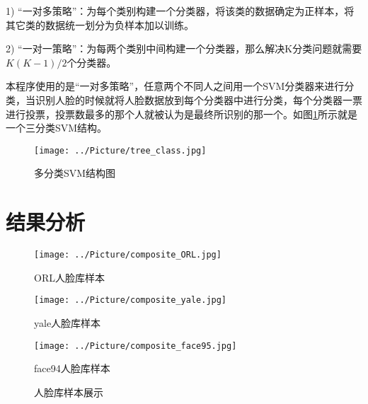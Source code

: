 \documentclass[a4paper,12pt]{ctexart}
\begin{document}
 1) “一对多策略”：为每个类别构建一个分类器，将该类的数据确定为正样本，将其它类的数据统一划分为负样本加以训练。
 
 2) “一对一策略”：为每两个类别中间构建一个分类器，那么解决K分类问题就需要$K(K-1)/2$个分类器。

 
 本程序使用的是“一对多策略”，任意两个不同人之间用一个SVM分类器来进行分类，当识别人脸的时候就将人脸数据放到每个分类器中进行分类，每个分类器一票进行投票，投票数最多的那个人就被认为是最终所识别的那一个。如图\ref{fig:msvm}所示就是一个三分类SVM结构。
 

\begin{figure}[!htb]
  \centering
  \texttt{[image: ../Picture/tree\_class.jpg]}
  \caption{多分类SVM结构图}
  \label{fig:msvm}
\end{figure}

\newpage
\section{结果分析}

\begin{figure}[ht]
\begin{minipage}{0.3\linewidth}
\centerline{\texttt{[image: ../Picture/composite\_ORL.jpg]}}
\centerline{ORL人脸库样本}
\end{minipage}
\quad
\begin{minipage}{0.3\linewidth}
\centerline{\texttt{[image: ../Picture/composite\_yale.jpg]}}
\centerline{yale人脸库样本}
\end{minipage}
\quad
\begin{minipage}{0.3\linewidth}
\centerline{\texttt{[image: ../Picture/composite\_face95.jpg]}}
\centerline{face94人脸库样本}
\end{minipage}
\caption{人脸库样本展示}
\end{figure}
\end{document}
